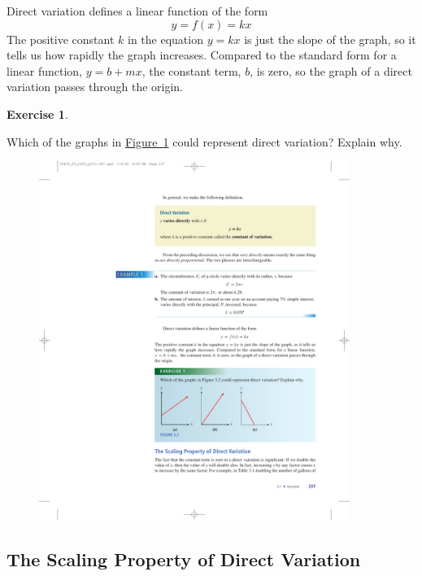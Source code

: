 \documentclass[10pt,]{book}
\theoremstyle{plain}
\theoremstyle{definition}
\theoremstyle{definition}
\theoremstyle{definition}
\theoremstyle{definition}
\theoremstyle{definition}
\newtheorem{exercise}[theorem]{Exercise}
\numberwithin{equation}{section}
\begin{document}
	Direct variation defines a linear function of the form
	\begin{equation*}y = f (x) = kx\end{equation*}
	The positive constant \(k\) in the equation \(y = kx\) is just the slope of the graph, so it tells us how rapidly the graph increases. Compared to the standard form for a linear function, \(y = b + mx\), the constant term, \(b\), is zero, so the graph of a direct variation passes through the origin.
%
\begin{exercise}\label{exercise-three-lines}

	Which of the graphs in \hyperref[fig-three-lines]{Figure~\ref{fig-three-lines}} could represent direct variation? Explain why.
	\leavevmode%
\begin{figure}
\centering
\includegraphics[width=0.90\textwidth,]{images/fig-three-lines.pdf}\caption{\label{fig-three-lines}}
\end{figure}
\end{exercise}
\typeout{************************************************}
\typeout{************************************************}
\subsection[The Scaling Property of Direct Variation]{The Scaling Property of Direct Variation}\label{subsection-57}
\end{document}
